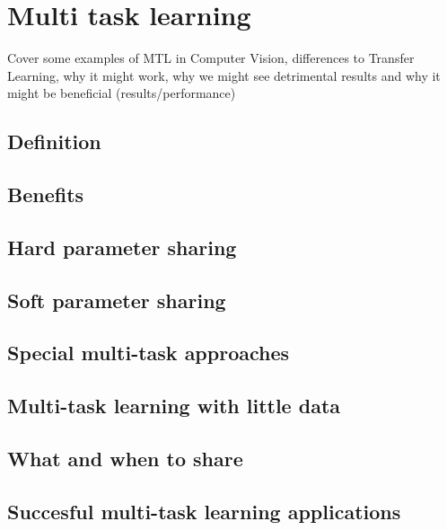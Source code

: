 \chapter{Multi task learning}
Cover some examples of MTL in Computer Vision, differences to Transfer Learning, why it might work, why we might see detrimental results and why it might be beneficial (results/performance)
\section{Definition}
\section{Benefits}
\section{Hard parameter sharing}
\section{Soft parameter sharing}
\section{Special multi-task approaches}
\section{Multi-task learning with little data}
\section{What and when to share}
\section{Succesful multi-task learning applications}